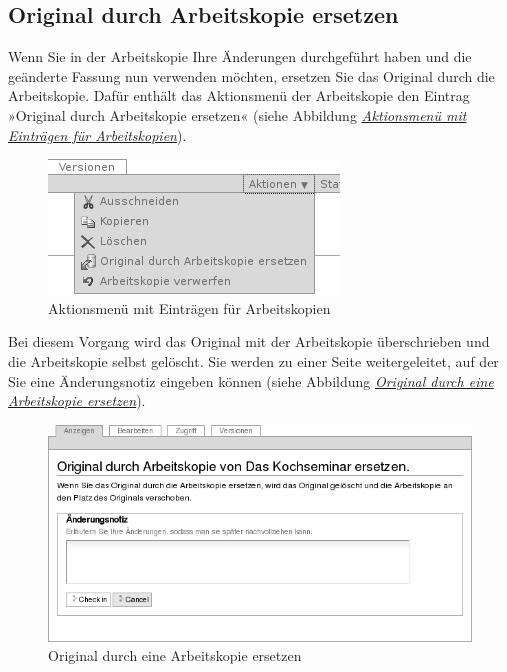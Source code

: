 \documentclass[a4paper,12pt,ngerman]{manual}
\begin{document}
\subsection{Original durch Arbeitskopie ersetzen}

Wenn Sie in der Arbeitskopie Ihre Änderungen durchgeführt haben und die
geänderte Fassung nun verwenden möchten, ersetzen Sie das Original durch die
Arbeitskopie. Dafür enthält das Aktionsmenü der Arbeitskopie den Eintrag
»Original durch Arbeitskopie ersetzen« (siehe
Abbildung \hyperlink{fig-original-durch-arbeitskopie-ersetzen}{\emph{Aktionsmenü mit Einträgen für Arbeitskopien}}).
\hypertarget{fig-original-durch-arbeitskopie-ersetzen}{}\begin{figure}[htbp]
\centering

\includegraphics{original-durch-arbeitskopie-ersetzen.png}
\caption{Aktionsmenü mit Einträgen für Arbeitskopien}\end{figure}

Bei diesem
Vorgang wird das Original mit der Arbeitskopie überschrieben und die
Arbeitskopie selbst gelöscht. Sie werden zu einer Seite weitergeleitet, auf
der Sie eine Änderungsnotiz eingeben können (siehe
Abbildung \hyperlink{fig-arbeitskopie-checkin-msg}{\emph{Original durch eine Arbeitskopie ersetzen}}).
\hypertarget{fig-arbeitskopie-checkin-msg}{}\begin{figure}[htbp]
\centering

\includegraphics{arbeitskopie-checkin-msg.png}
\caption{Original durch eine Arbeitskopie ersetzen}\end{figure}
\end{document}
